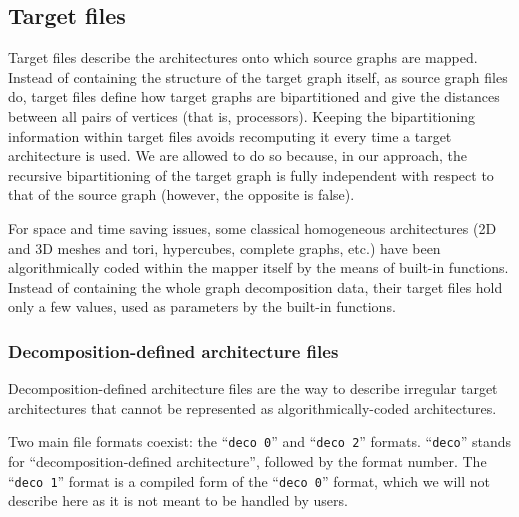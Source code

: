 \subsection{Target files}
\label{sec-file-target}

Target files describe the architectures onto which source graphs are mapped.
Instead of containing the structure of the target graph itself, as source
graph files do, target files define how target graphs are bipartitioned and
give the distances between all pairs of vertices (that is, processors).
Keeping the bipartitioning information within target files avoids
recomputing it every time a target architecture is used.
We are allowed to do so because, in our approach, the recursive
bipartitioning of the target graph is fully independent with respect to that
of the source graph (however, the opposite is false).

For space and time saving issues, some classical homogeneous architectures
(2D and 3D meshes and tori, hypercubes, complete graphs, etc\@.) have been
algorithmically coded within the mapper itself by the means of built-in
functions.
Instead of containing the whole graph decomposition data, their target
files hold only a few values, used as parameters by the built-in functions.

\subsubsection{Decomposition-defined architecture files}
\label{sec-file-target-deco}

Decomposition-defined architecture files are the way to describe
irregular target architectures that cannot be represented as
algorithmically-coded architectures.

Two main file formats coexist: the ``\texttt{deco 0}'' and
``\texttt{deco 2}'' formats. ``\texttt{deco}'' stands for
``decomposition-defined architecture'', followed by the format
number. The ``\texttt{deco 1}'' format is a compiled form of the
``\texttt{deco 0}'' format, which we will not describe here as it is
not meant to be handled by users.

